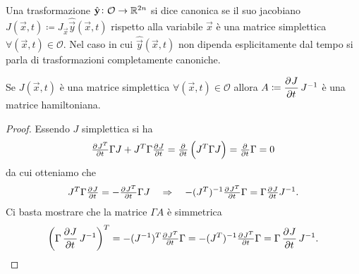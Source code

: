\begin{definition}
    Una trasformazione $ \hat{\mathbf{y}} \colon \mathcal{O} \to \mathbb{R}^{2n} $ si dice canonica se il suo jacobiano $ J(\vec{x}, t) \coloneqq J_\vec{x} \hat{\vec{y}}(\vec{x}, t) $ rispetto alla variabile $ \vec{x} $ è una matrice simplettica $ \forall (\vec{x}, t) \in \mathcal{O} $. Nel caso in cui $ \hat{\vec{y}}(\vec{x}, t) $ non dipenda esplicitamente dal tempo si parla di trasformazioni completamente canoniche.
\end{definition}

\begin{lemma} \label{lem:jacob-simplettica}
    Se $ J(\vec{x}, t) $ è una matrice simplettica $ \forall (\vec{x}, t) \in \mathcal{O} $ allora $ A \coloneqq \dpd{J}{t} J^{-1} $ è una matrice hamiltoniana.
\end{lemma}
\begin{proof}
    Essendo $ J $ simplettica si ha
    \[
        \pd{J^T}{t} \Gamma J + J^T \Gamma \pd{J}{t} = \pd{}{t} \left(J^T \Gamma J\right) = \pd{}{t} \Gamma = 0
    \]
    da cui otteniamo che
    \[
        J^T \Gamma \pd{J}{t} = - \pd{J^T}{t} \Gamma J \quad \Rightarrow \quad - (J^T)^{-1} \pd{J^T}{t} \Gamma = \Gamma \pd{J}{t} J^{-1}.
    \]
    Ci basta mostrare che la matrice $ \Gamma A $ è simmetrica
    \[
        \left(\Gamma \dpd{J}{t} J^{-1} \right)^T = - (J^{-1})^T \pd{J^T}{t} \Gamma = - (J^T)^{-1} \pd{J^T}{t} \Gamma = \Gamma \dpd{J}{t} J^{-1}. \qedhere
    \]
\end{proof}

